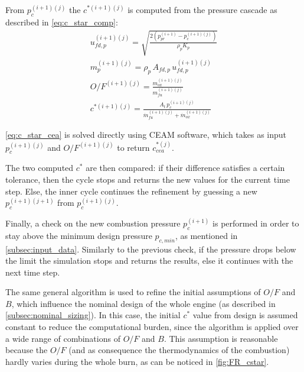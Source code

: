 From $p_c ^ {(i+1)(j)}$ the $c^{*(i+1)(j)}$ is computed from the pressure cascade as described in \autoref{eq:c_star_comp}:
\begin{gather}
    u_{fd,p} ^ {(i+1)(j)} = \sqrt{\frac{2 \left( p_{pr} ^ {(i+1)} - p_c ^ {(i+1)(j)} \right)}{\rho_p K_p}}
    \\[3pt]
    m_p ^ {(i+1)(j)} = \rho_p \, A_{fd,p} \, u_{fd,p} ^ {(i+1)(j)}
    \\[3pt]
    O/F ^ {(i+1)(j)} = \frac{m_{ox} ^ {(i+1)(j)}}{m_{fu} ^ {(i+1)(j)}}
    \\[3pt]
    c^{*(i+1)(j)} = \frac{A_t \, p_c ^ {(i+1)(j)}}{\dot{m}_{fu} ^ {(i+1)(j)} + \dot{m}_{ox} ^ {(i+1)(j)}}
\end{gather}

\autoref{eq:c_star_cea} is solved directly using CEAM software, which takes as input $p_c ^ {(i+1)(j)}$ and $O/F ^ {(i+1)(j)}$ to return $c_{cea}^{*(j)}$.

The two computed $c^*$ are then compared: if their difference satisfies a certain tolerance, then the cycle stops and returns the new values for the current time step. Else, the inner cycle continues the refinement by guessing a new $p_c ^ {(i+1)(j+1)}$ from $p_c ^ {(i+1)(j)}$.

Finally, a check on the new combustion pressure $p_c ^ {(i+1)}$ is performed in order to stay above the minimum design pressure $p_{c,min}$, as mentioned in \autoref{subsec:input_data}. Similarly to the previous check, if the pressure drops below the limit the simulation stops and returns the results, else it continues with the next time step.

\vspace*{3mm}

The same general algorithm is used to refine the initial assumptions of $O/F$ and $B$, which influence the nominal design of the whole engine (as described in \autoref{subsec:nominal_sizing}).
In this case, the initial $c^*$ value from design is assumed constant to reduce the computational burden, since the algorithm is applied over a wide range of combinations of $O/F$ and $B$. This assumption is reasonable because the $O/F$ (and as consequence the thermodynamics of the combustion) hardly varies during the whole burn, as can be noticed in \autoref{fig:FR_cstar}.
